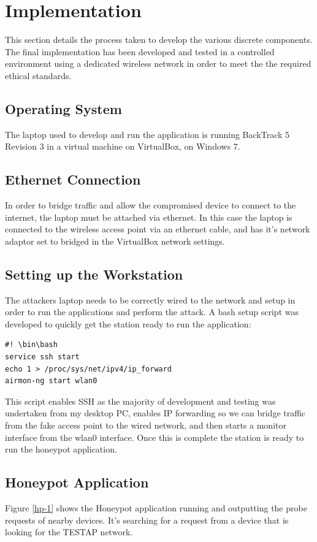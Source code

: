 \section{Implementation}
This section details the process taken to develop the various discrete components. The final implementation has been developed and tested in a controlled environment using a dedicated wireless network in order to meet the the required ethical standards.

\subsection{Operating System}
The laptop used to develop and run the application is running BackTrack 5 Revision 3 in a virtual machine on VirtualBox, on Windows 7.

\subsection{Ethernet Connection}
In order to bridge traffic and allow the compromised device to connect to the internet, the laptop must be attached via ethernet. In this case the laptop is connected to the wireless access point via an ethernet cable, and has it’s network adaptor set to bridged in the VirtualBox network settings.

\subsection{Setting up the Workstation}
The attackers laptop needs to be correctly wired to the network and setup in order to run the applications and perform the attack. A bash setup script was developed to quickly get the station ready to run the application:

\begin{verbatim}
#! \bin\bash
service ssh start
echo 1 > /proc/sys/net/ipv4/ip_forward
airmon-ng start wlan0
\end{verbatim}

This script enables SSH as the majority of development and testing was undertaken from my desktop PC, enables IP forwarding so we can bridge traffic from the fake access point to the wired network, and then starts a monitor interface from the wlan0 interface. Once this is complete the station is ready to run the honeypot application.
\clearpage
\subsection{Honeypot Application}
Figure \ref{hp-1} shows the Honeypot application running and outputting the probe requests of nearby devices. It's searching for a request from a device that is looking for the TESTAP network.

